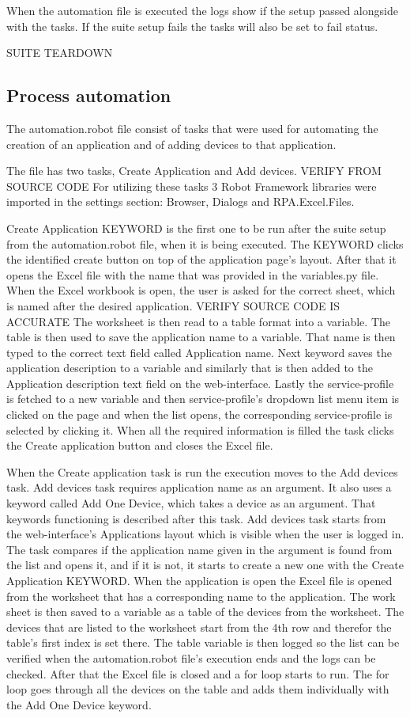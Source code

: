 When the automation file is executed the logs show if the setup passed alongside with the tasks.
If the suite setup fails the tasks will also be set to fail status.

SUITE TEARDOWN

\subsection{Process automation}
The automation.robot file consist of tasks that were used for automating the creation of an application and of adding devices to that application.

The file has two tasks, Create Application and Add devices. VERIFY FROM SOURCE CODE
For utilizing these tasks 3 Robot Framework libraries were imported in the settings section: Browser, Dialogs and RPA.Excel.Files.

Create Application KEYWORD is the first one to be run after the suite setup from the automation.robot file, when it is being executed.
The KEYWORD clicks the identified create button on top of the application page's layout.
After that it opens the Excel file with the name that was provided in the variables.py file.
When the Excel workbook is open, the user is asked for the correct sheet, which is named after the desired application. VERIFY SOURCE CODE IS ACCURATE
The worksheet is then read to a table format into a variable.
The table is then used to save the application name to a variable.
That name is then typed to the correct text field called Application name.
Next keyword saves the application description to a variable and similarly that is then added to the Application description text field on the web-interface.
Lastly the service-profile is fetched to a new variable and then service-profile's dropdown list menu item is clicked on the page and when the list opens, the corresponding service-profile is selected by clicking it.
When all the required information is filled the task clicks the Create application button and closes the Excel file.

When the Create application task is run the execution moves to the Add devices task.
Add devices task requires application name as an argument.
It also uses a keyword called Add One Device, which takes a device as an argument. That keywords functioning is described after this task.
Add devices task starts from the web-interface's Applications layout which is visible when the user is logged in. 
The task compares if the application name given in the argument is found from the list and opens it, and if it is not, it starts to create a new one with the Create Application KEYWORD.
When the application is open the Excel file is opened from the worksheet that has a corresponding name to the application.
The work sheet is then saved to a variable as a table of the devices from the worksheet.
The devices that are listed to the worksheet start from the 4th row and therefor the table's first index is set there.
The table variable is then logged so the list can be verified when the automation.robot file's execution ends and the logs can be checked.
After that the Excel file is closed and a for loop starts to run.
The for loop goes through all the devices on the table and adds them individually with the Add One Device keyword.

